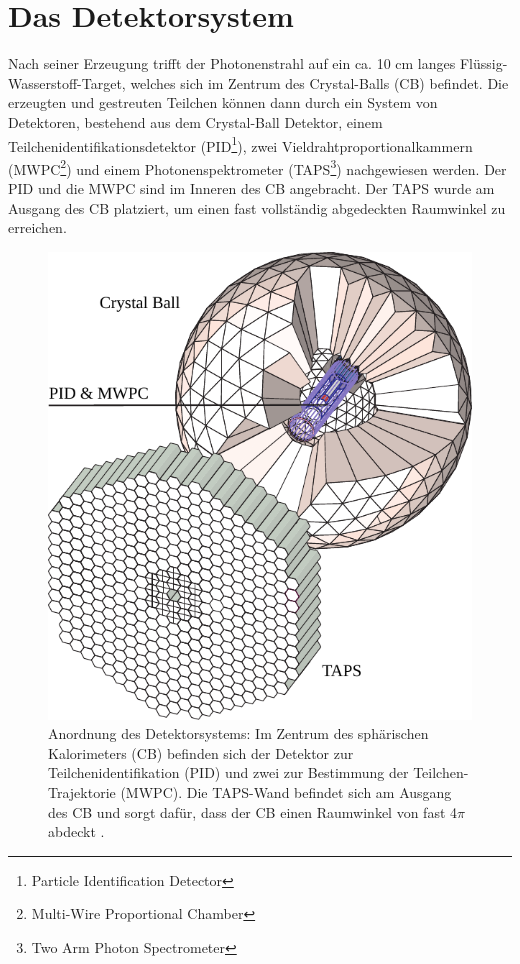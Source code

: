 \documentclass[a4paper,11pt,oneside,final,german,openbib,pdftex]{scrbook}
\begin{document}
{\section{Das Detektorsystem}
\label{sec:Das-Detektorsystem}
Nach seiner Erzeugung trifft der Photonenstrahl auf ein ca. 10 cm langes Flüssig-Wasserstoff-Target, welches sich im Zentrum des Crystal-Balls (CB) befindet. Die erzeugten und gestreuten Teilchen können dann durch ein System von Detektoren, bestehend aus dem Crystal-Ball Detektor, einem Teilchenidentifikationsdetektor (PID\footnote{Particle Identification Detector}), zwei Vieldrahtproportionalkammern (MWPC\footnote{Multi-Wire Proportional Chamber}) und einem Photonenspektrometer (TAPS\footnote{Two Arm  Photon Spectrometer}) nachgewiesen werden. Der PID und die MWPC sind im Inneren des CB angebracht. Der TAPS wurde am Ausgang des CB platziert, um einen fast vollständig abgedeckten Raumwinkel zu erreichen.
\begin{figure}[h!]
	\begin{center}
		\includegraphics{crystal_ball}
	
		\caption[Anordnung des Detektorsystems] {Anordnung des Detektorsystems: Im Zentrum des sph\"arischen Kalorimeters (CB) befinden sich der Detektor zur Teilchenidentifikation (PID) und zwei zur Bestimmung der Teilchen-Trajektorie (MWPC). Die TAPS-Wand befindet sich am Ausgang des CB und sorgt daf\"ur, dass der CB einen Raumwinkel von fast 4$\pi$ abdeckt \cite{We13}.}
		\label{[fig.crystal_ball]}	
\end{center}
\end{figure}

}
\end{document}
